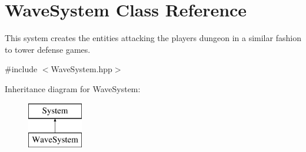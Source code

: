 \hypertarget{class_wave_system}{}\section{Wave\+System Class Reference}
\label{class_wave_system}


This system creates the entities attacking the player\textquotesingle{}s dungeon in a similar fashion to tower defense games.  




{\ttfamily \#include $<$Wave\+System.\+hpp$>$}

Inheritance diagram for Wave\+System\+:\begin{figure}[H]
\begin{center}
\leavevmode
\includegraphics[height=2.000000cm]{class_wave_system}
\end{center}
\end{figure}
